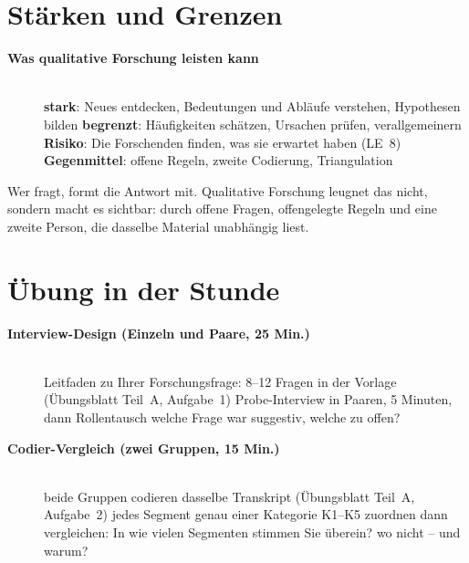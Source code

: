 \section{Stärken und Grenzen}
\begin{description}
\item[{\rot\bf Was qualitative Forschung leisten kann}]~\\[-\lblskip]
\bi
  \ite \textbf{stark}: Neues entdecken, Bedeutungen und Abläufe verstehen,
    Hypothesen bilden
  \ite \textbf{begrenzt}: Häufigkeiten schätzen, Ursachen prüfen,
    verallgemeinern
  \ite \textbf{Risiko}: Die Forschenden finden, was sie erwartet haben
    (LE~8)
  \ite \textbf{Gegenmittel}: offene Regeln, zweite Codierung, Triangulation
\ei
{}
\os{\newpage}
\end{description}

\begin{merkbox}
Wer fragt, formt die Antwort mit. Qualitative Forschung leugnet das nicht,
sondern macht es sichtbar: durch offene Fragen, offengelegte Regeln und
eine zweite Person, die dasselbe Material unabhängig liest.
\end{merkbox}
\os{\newpage}

\section{Übung in der Stunde}
\begin{description}
\item[{\rot\bf Interview-Design (Einzeln und Paare, 25 Min.)}]~\\[-\lblskip]
\bi
  \ite Leitfaden zu Ihrer Forschungsfrage: 8--12 Fragen in der Vorlage
    (Übungsblatt Teil~A, Aufgabe~1)
  \ite Probe-Interview in Paaren, 5 Minuten, dann Rollentausch
  \ite welche Frage war suggestiv, welche zu offen?
\ei
\os{\newpage}

\item[{\rot\bf Codier-Vergleich (zwei Gruppen, 15 Min.)}]~\\[-\lblskip]
\bi
  \ite beide Gruppen codieren dasselbe Transkript (Übungsblatt Teil~A,
    Aufgabe~2)
  \ite jedes Segment genau einer Kategorie K1--K5 zuordnen
  \ite dann vergleichen: In wie vielen Segmenten stimmen Sie überein?
  \ite wo nicht -- und warum?
\ei
\os{\newpage}
\end{description}

